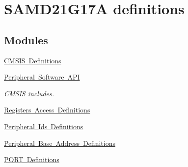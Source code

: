\hypertarget{group___s_a_m_d21_g17_a__definitions}{}\section{S\+A\+M\+D21\+G17A definitions}
\label{group___s_a_m_d21_g17_a__definitions}
\subsection*{Modules}
\begin{DoxyCompactItemize}
\item 
\mbox{\hyperlink{group___s_a_m_d21_g17_a__cmsis}{C\+M\+S\+I\+S Definitions}}
\item 
\mbox{\hyperlink{group___s_a_m_d21_g17_a__api}{Peripheral Software A\+PI}}
\begin{DoxyCompactList}\small\item\em C\+M\+S\+IS includes. \end{DoxyCompactList}\item 
\mbox{\hyperlink{group___s_a_m_d21_g17_a__reg}{Registers Access Definitions}}
\item 
\mbox{\hyperlink{group___s_a_m_d21_g17_a__id}{Peripheral Ids Definitions}}
\item 
\mbox{\hyperlink{group___s_a_m_d21_g17_a__base}{Peripheral Base Address Definitions}}
\item 
\mbox{\hyperlink{group___s_a_m_d21_g17_a__port}{P\+O\+R\+T Definitions}}
\end{DoxyCompactItemize}
